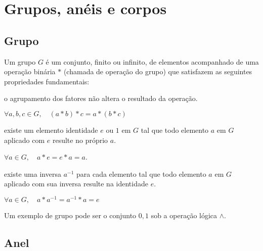 \documentclass[12pt]{article}
\begin{document}
\section{Grupos, anéis e corpos}

\subsection{Grupo}

Um grupo $G$ é um conjunto, finito ou infinito, de elementos acompanhado de uma
operação binária $*$ (chamada de operação do grupo) que satisfazem as seguintes
propriedades fundamentais:

\begin{description}
    \setlength\itemsep{1em}

    \item[Associatividade:] o agrupamento dos fatores não altera o resultado da
        operação.
        \newline
        \begin{center}
            $\forall a, b, c \in G, \quad (a*b)*c = a*(b*c)$
        \end{center}

    \item[Identidade:] existe um elemento identidade $e$ ou $1$ em $G$ tal que
        todo elemento $a$ em $G$ aplicado com $e$ resulte no próprio $a$.
        \newline
        \begin{center}
            $\forall a \in G, \quad a*e = e*a = a$.
        \end{center}

    \item[Inversa:] existe uma inversa $a^{-1}$ para cada elemento tal que todo
        elemento $a$ em $G$ aplicado com sua inversa resulte na identidade $e$.
        \newline
        \begin{center}
            $\forall a \in G, \quad a*a^{-1} = a^{-1}*a = e$
        \end{center}

\end{description}

Um exemplo de grupo pode ser o conjunto ${0, 1}$ sob a operação lógica $\land$.

\subsection{Anel}
\end{document}
